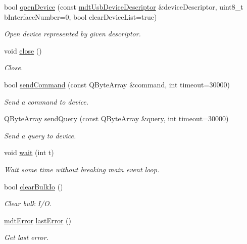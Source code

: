 \begin{DoxyCompactItemize}
bool \hyperlink{classmdt_usbtmc_port_abe30ec243e9dbf3de49cb1d9be5e1a16}{open\-Device} (const \hyperlink{classmdt_usb_device_descriptor}{mdt\-Usb\-Device\-Descriptor} \&device\-Descriptor, uint8\-\_\-t b\-Interface\-Number=0, bool clear\-Device\-List=true)
\begin{DoxyCompactList}\small\item\em Open device represented by given descriptor. \end{DoxyCompactList}\item 
void \hyperlink{classmdt_usbtmc_port_a6fec5e49a42e6c2e6202a8b2f7f0dc37}{close} ()
\begin{DoxyCompactList}\small\item\em Close. \end{DoxyCompactList}\item 
bool \hyperlink{classmdt_usbtmc_port_ad03633a2c6289974d79f361c6dbba5af}{send\-Command} (const Q\-Byte\-Array \&command, int timeout=30000)
\begin{DoxyCompactList}\small\item\em Send a command to device. \end{DoxyCompactList}\item 
Q\-Byte\-Array \hyperlink{classmdt_usbtmc_port_a0c250cc416a01d2dd704b629b163d3a6}{send\-Query} (const Q\-Byte\-Array \&query, int timeout=30000)
\begin{DoxyCompactList}\small\item\em Send a query to device. \end{DoxyCompactList}\item 
void \hyperlink{classmdt_usbtmc_port_ae30c4eb212e9859a834c53df052e1da9}{wait} (int t)
\begin{DoxyCompactList}\small\item\em Wait some time without breaking main event loop. \end{DoxyCompactList}\item 
bool \hyperlink{classmdt_usbtmc_port_afbf76bc83c54937dfb0e88ad6f517dc5}{clear\-Bulk\-Io} ()
\begin{DoxyCompactList}\small\item\em Clear bulk I/\-O. \end{DoxyCompactList}\item 
\hyperlink{classmdt_error}{mdt\-Error} \hyperlink{classmdt_usbtmc_port_ad08e3ff4682797e8604400026418bdc8}{last\-Error} ()
\begin{DoxyCompactList}\small\item\em Get last error. \end{DoxyCompactList}\item 

\end{DoxyCompactItemize}
